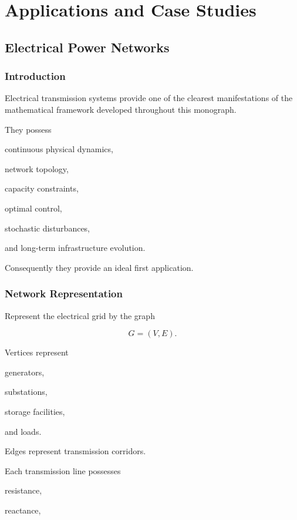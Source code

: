 \documentclass[11pt,fleqn]{book}
\numberwithin{equation}{chapter}
\theoremstyle{plain}
\theoremstyle{definition}
\theoremstyle{remark}
\begin{document}
\part{Applications and Case Studies}

\chapter{Electrical Power Networks}
\label{chap:electrical-power-networks}

\section{Introduction}

Electrical transmission systems provide one of the clearest
manifestations of the mathematical framework developed throughout this
monograph.

They possess

continuous physical dynamics,

network topology,

capacity constraints,

optimal control,

stochastic disturbances,

and long-term infrastructure evolution.

Consequently they provide an ideal first application.


\section{Network Representation}

Represent the electrical grid by the graph

\[
G=(V,E).
\]

Vertices represent

generators,

substations,

storage facilities,

and loads.

Edges represent transmission corridors.

Each transmission line possesses

resistance,

reactance,
\end{document}
